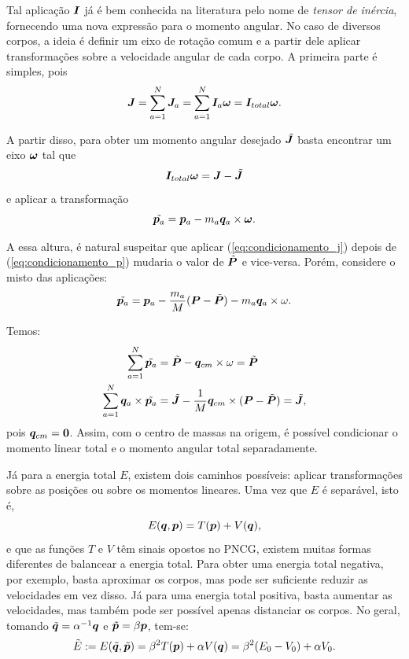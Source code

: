 Tal aplicação $\bm I$ já é bem conhecida na literatura pelo nome de \textit{tensor de inércia}, fornecendo uma nova expressão para o momento angular. No caso de diversos corpos, a ideia é definir um eixo de rotação comum e a partir dele aplicar transformações sobre a velocidade angular de cada corpo. A primeira parte é simples, pois
\begin{equation*}
    \bm J = \sum_{a=1}^{N} \bm J_a = \sum_{a=1}^{N} \bm I_a \bm \omega = \bm I_{total} \bm \omega.
\end{equation*}

A partir disso, para obter um momento angular desejado $\tilde{\bm J}$ basta encontrar um eixo $\bm \omega$ tal que
\begin{equation*}
    \bm I_{total} \bm \omega = \bm J - \tilde{\bm J}
\end{equation*}
e aplicar a transformação
\begin{equation}\label{eq:condicionamento_j}
    \tilde{\bm p_a} = \bm p_a - m_a \bm q_a \times \bm \omega.
\end{equation}

A essa altura, é natural suspeitar que aplicar (\ref{eq:condicionamento_j}) depois de (\ref{eq:condicionamento_p}) mudaria o valor de $\tilde{\bm P}$ e vice-versa. Porém, considere o misto das aplicações:
\begin{equation}\label{eq:condicionamento_j_p}
    \tilde{\bm p_a} = \bm p_a - \dfrac{m_a}{M}(\bm P - \tilde{\bm P}) - m_a \bm q_a \times \omega.
\end{equation}

Temos:
\begin{align*}
    \sum_{a=1}^{N} \tilde{\bm p_a}
    & = \tilde{\bm P} - \bm q_{cm} \times \omega = \tilde{\bm P}
    \\
    \sum_{a=1}^{N} \bm q_a \times \tilde{\bm p_a}
    & = \tilde{\bm J} - \dfrac{1}{M} \bm q_{cm} \times (\bm P - \tilde{\bm P}) = \tilde{\bm J},
\end{align*}
pois $\bm q_{cm} = \bm 0$. Assim, com o centro de massas na origem, é possível condicionar o momento linear total e o momento angular total separadamente.

Já para a energia total $E$, existem dois caminhos possíveis: aplicar transformações sobre as posições ou sobre os momentos lineares. Uma vez que $E$ é separável, isto é,
\begin{equation*}
    E(\bm q, \bm p) = T(\bm p) + V(\bm q),
\end{equation*}
e que as funções $T$ e $V$ têm sinais opostos no PNCG, existem muitas formas diferentes de balancear a energia total. Para obter uma energia total negativa, por exemplo, basta aproximar os corpos, mas pode ser suficiente reduzir as velocidades em vez disso. Já para uma energia total positiva, basta aumentar as velocidades, mas também pode ser possível apenas distanciar os corpos. No geral, tomando $\tilde{\bm q} = \alpha^{-1} \bm q$ e $\tilde{\bm p} = \beta \bm p$, tem-se:
\begin{equation*}
    \tilde E := E(\tilde{\bm q}, \tilde{\bm p}) = \beta^2 T(\bm p) + \alpha V (\bm q) = \beta^2 (E_0 - V_0) + \alpha V_0.
\end{equation*}

